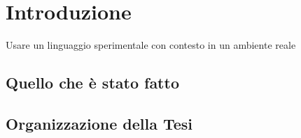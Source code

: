 
\chapter{Introduzione}  %

Usare un linguaggio sperimentale con contesto in un ambiente reale

\ifpdf
    \graphicspath{{Chapter1/Figs/Raster/}{Chapter1/Figs/PDF/}{Chapter1/Figs/}}
\else
    \graphicspath{{Chapter1/Figs/Vector/}{Chapter1/Figs/}}
\fi


\section{Quello che è stato fatto} %

 

\section{Organizzazione della Tesi} %




 